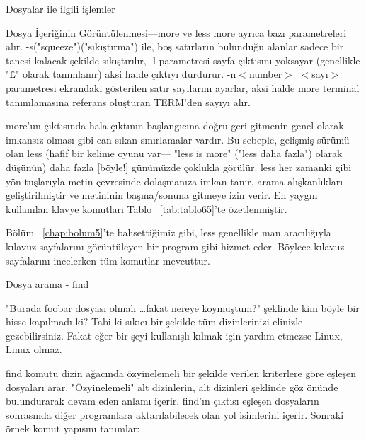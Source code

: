 \begin{section}{Dosyalar ile ilgili işlemler}
\begin{subsection}{Dosya İçeriğinin Görüntülenmesi—more ve less}
more ayrıca bazı parametreleri alır. -s("squeeze")("sıkıştırma") ile, boş satırların bulunduğu alanlar sadece bir tanesi kalacak şekilde sıkıştırılır, -l parametresi sayfa çıktısını yoksayar (genellikle "\^L" olarak tanımlanır) aksi halde çıktıyı durdurur. -n$<$number$>$ $<$sayı$>$ parametresi ekrandaki gösterilen satır sayılarını ayarlar, aksi halde more terminal tanımlamasına referans oluşturan TERM'den sayıyı alır.

more'un çıktısında hala çıktının başlangıcına doğru geri gitmenin genel olarak imkansız olması gibi can sıkan sınırlamalar vardır. Bu sebeple, gelişmiş sürümü olan less (hafif bir kelime oyunu var— "less is more" ("less daha fazla") olarak düşünün) daha fazla [böyle!] günümüzde çoklukla görülür. less her zamanki gibi yön tuşlarıyla metin çevresinde dolaşmanıza imkan tanır, arama alışkanlıkları geliştirilmiştir ve metininin başına/sonuna gitmeye izin verir. En yaygın kullanılan klavye komutları Tablo ~\ref{tab:tablo65}'te özetlenmiştir.

Bölüm ~\ref{chap:bolum5}'te bahsettiğimiz gibi, less genellikle man aracılığıyla kılavuz sayfalarını görüntüleyen bir program gibi hizmet eder. Böylece kılavuz sayfalarını incelerken tüm komutlar mevcuttur.
\end{subsection}
\begin{subsection}{Dosya arama - find}\label{sec:bolum644}

"Burada foobar dosyası olmalı \ldots fakat nereye koymuştum?" şeklinde kim böyle bir hisse kapılmadı ki? Tabi ki sıkıcı bir şekilde tüm dizinlerinizi elinizle gezebilirsiniz. Fakat eğer bir şeyi kullanışlı kılmak için yardım etmezse Linux, Linux olmaz.

find komutu dizin ağacında özyinelemeli bir şekilde verilen kriterlere göre eşleşen dosyaları arar. "Özyinelemeli" alt dizinlerin, alt dizinleri şeklinde göz önünde bulundurarak devam eden anlamı içerir. find'ın çıktısı eşleşen dosyaların sonrasında diğer programlara aktarılabilecek olan yol isimlerini içerir. Sonraki örnek komut yapısını tanımlar:


\end{subsection}
\end{section}
